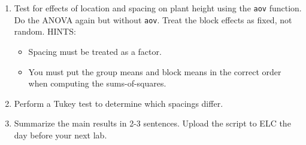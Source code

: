 \documentclass[color=usenames,dvipsnames]{beamer}\usepackage[]{graphicx}\usepackage[]{color}
\newcommand{\inr}[1]{\colorbox{inlinecolor}{\texttt{#1}}}
\begin{document}
\begin{frame}
\begin{enumerate}[(1)]
      \item Test for effects of location and spacing on plant height
        using the \inr{aov} function. Do the ANOVA again but without
        \inr{aov}. Treat the block effects as fixed, not random. HINTS:
        \begin{itemize}
          \tiny
          \item Spacing must be treated as a factor.
          \item You must put the group means and block means in the
            correct order when computing the sums-of-squares.
        \end{itemize}
      \item Perform a Tukey test to determine which spacings differ.
      \item Summarize the main results in 2-3 sentences. Upload the
        script to ELC the day before your next lab.
    \end{enumerate}
\end{frame}
\end{document}
